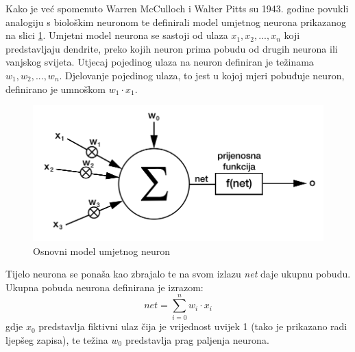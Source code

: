 Kako je već spomenuto Warren McCulloch i Walter Pitts su 1943. godine povukli analogiju s biološkim neuronom te definirali model umjetnog neurona prikazanog na slici \ref{fig:neuron_model}. Umjetni model neurona se sastoji od ulaza $x_1, x_2, ..., x_n$ koji predstavljaju dendrite, preko kojih neuron prima pobudu od drugih neurona ili vanjskog svijeta. Utjecaj pojedinog ulaza na neuron definiran je težinama $w_1, w_2, ..., w_n$. Djelovanje pojedinog ulaza, to jest u kojoj mjeri pobuđuje neuron, definirano je umnoškom $w_1 \cdot x_1$.
\begin{figure}[htb]
    \centering
    \includegraphics[width=14cm]{images/neuron_model.png}
    \caption{Osnovni model umjetnog neuron}
    \label{fig:neuron_model}
\end{figure}
Tijelo neurona se ponaša kao zbrajalo te na svom izlazu \emph{net} daje ukupnu pobudu. Ukupna pobuda neurona definirana je izrazom: $$net = \sum_{i=0}^{n} w_i \cdot x_i$$ gdje $x_0$ predstavlja fiktivni ulaz čija je vrijednost uvijek 1 (tako je prikazano radi ljepšeg zapisa), te težina $w_0$ predstavlja prag paljenja neurona.

